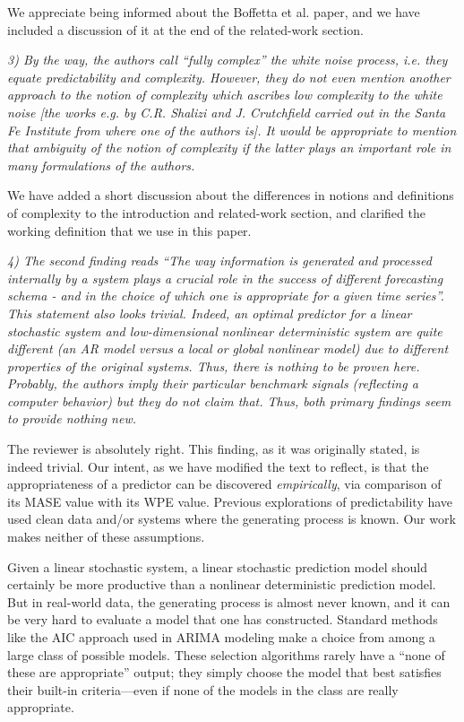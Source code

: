 \documentclass[12pt]{article}
\begin{document}
We appreciate being informed about the Boffetta et al.  paper, and we
have included a discussion of it at the end of the related-work
section.

\smallskip

\emph{3) By the way, the authors call ``fully complex'' the white
  noise process, i.e. they equate predictability and
  complexity. However, they do not even mention another approach to
  the notion of complexity which ascribes low complexity to the white
  noise [the works e.g. by C.R. Shalizi and J. Crutchfield carried out
    in the Santa Fe Institute from where one of the authors is]. It
  would be appropriate to mention that ambiguity of the notion of
  complexity if the latter plays an important role in many
  formulations of the authors.}

We have added a short discussion about the differences in notions and
definitions of complexity to the introduction and related-work
section, and clarified the working definition that we use in this
paper.

\smallskip

\emph{4) The second finding reads ``The way information is generated
  and processed internally by a system plays a crucial role in the
  success of different forecasting schema - and in the choice of which
  one is appropriate for a given time series''. This statement also
  looks trivial. Indeed, an optimal predictor for a linear stochastic
  system and low-dimensional nonlinear deterministic system are quite
  different (an AR model versus a local or global nonlinear model) due
  to different properties of the original systems. Thus, there is
  nothing to be proven here. Probably, the authors imply their
  particular benchmark signals (reflecting a computer behavior) but
  they do not claim that.  Thus, both primary findings seem to provide
  nothing new.}

The reviewer is absolutely right.  This finding, as it was originally
stated, is indeed trivial.  Our intent, as we have modified the text
to reflect, is that the appropriateness of a predictor can be
discovered \emph{empirically}, via comparison of its MASE value with
its WPE value.  Previous explorations of predictability have used
clean data and/or systems where the generating process is known.  Our
work makes neither of these assumptions.

Given a linear stochastic system, a linear stochastic prediction model
should certainly be more productive than a nonlinear deterministic
prediction model.  But in real-world data, the generating process is
almost never known, and it can be very hard to evaluate a model that
one has constructed.  Standard methods like the AIC approach used in
ARIMA modeling make a choice from among a large class of possible
models.  These selection algorithms rarely have a ``none of these are
appropriate'' output; they simply choose the model that best satisfies
their built-in criteria---even if none of the models in the class are
really appropriate.
\end{document}
